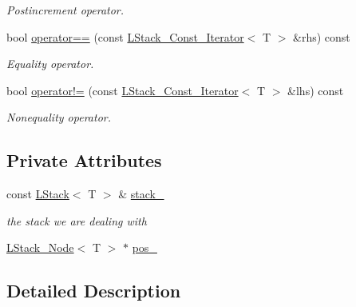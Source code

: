 \begin{DoxyCompactItemize}
\begin{DoxyCompactList}\small\item\em Postincrement operator. \item\end{DoxyCompactList}\item 
bool \hyperlink{classMadara_1_1Utility_1_1LStack__Const__Iterator_a8025ecfc7674f874f927170f9a3b1b8a}{operator==} (const \hyperlink{classMadara_1_1Utility_1_1LStack__Const__Iterator}{LStack\_\-Const\_\-Iterator}$<$ T $>$ \&rhs) const 
\begin{DoxyCompactList}\small\item\em Equality operator. \item\end{DoxyCompactList}\item 
bool \hyperlink{classMadara_1_1Utility_1_1LStack__Const__Iterator_ad1b5bf290d720fc1a082e60cb60b64aa}{operator!=} (const \hyperlink{classMadara_1_1Utility_1_1LStack__Const__Iterator}{LStack\_\-Const\_\-Iterator}$<$ T $>$ \&lhs) const 
\begin{DoxyCompactList}\small\item\em Nonequality operator. \item\end{DoxyCompactList}\end{DoxyCompactItemize}
\subsection*{Private Attributes}
\begin{DoxyCompactItemize}
\item 
const \hyperlink{classMadara_1_1Utility_1_1LStack}{LStack}$<$ T $>$ \& \hyperlink{classMadara_1_1Utility_1_1LStack__Const__Iterator_a7894cd9a3d63031443f60c0e227b853a}{stack\_\-}
\begin{DoxyCompactList}\small\item\em the stack we are dealing with \item\end{DoxyCompactList}\item 
\hyperlink{classMadara_1_1Utility_1_1LStack__Node}{LStack\_\-Node}$<$ T $>$ $\ast$ \hyperlink{classMadara_1_1Utility_1_1LStack__Const__Iterator_a123f9f0e456f02b83ec0868c6c0e4936}{pos\_\-}
\end{DoxyCompactItemize}


\subsection{Detailed Description}
